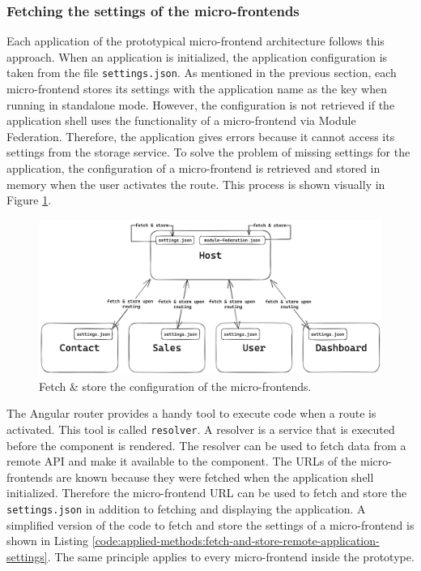 \subsubsection{Fetching the settings of the micro-frontends}\label{subsubsection:applied-methods:prototypical-implementation
:load-the-configuration}

Each application of the prototypical micro-frontend architecture follows this approach. When an application is initialized, the application configuration is taken from the file \texttt{settings.json}. As mentioned in the previous section, each micro-frontend stores its settings with the application name as the key when running in standalone mode. However, the configuration is not retrieved if the application shell uses the functionality of a micro-frontend via Module Federation. Therefore, the application gives errors because it cannot access its settings from the storage service. To solve the problem of missing settings for the application, the configuration of a micro-frontend is retrieved and stored in memory when the user activates the route. This process is shown visually in Figure \ref{fig:applied-methods:load-remote-settings}.

\ifshowImages
  \begin{figure}[H]
  \centering
  \includegraphics[width=1\linewidth]{images/applied-methods/prototypical-implementation/load-remote-settings.png}
  \caption{Fetch \& store the configuration of the micro-frontends.}\label{fig:applied-methods:load-remote-settings}
  \end{figure}
\fi

\noindent The Angular router provides a handy tool to execute code when a route is activated. This tool is called \texttt{resolver}. A resolver is a service that is executed before the component is rendered. The resolver can be used to fetch data from a remote \ac{API} and make it available to the component. \cite{misc:-:applied-methods:micro-frontends:angular-router-resolver} The \acp{URL} of the micro-frontends are known because they were fetched when the application shell initialized. Therefore the micro-frontend \ac{URL} can be used to fetch and store the \texttt{settings.json} in addition to fetching and displaying the application. A simplified version of the code to fetch and store the settings of a micro-frontend is shown in Listing \ref{code:applied-methods:fetch-and-store-remote-application-settings}. The same principle applies to every micro-frontend inside the prototype.

